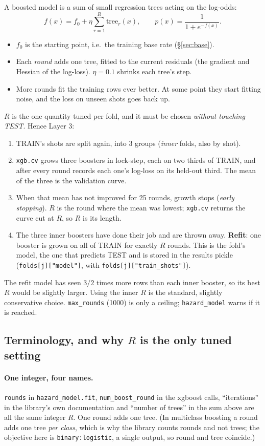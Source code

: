 \documentclass[11pt]{article}
\begin{document}
A boosted model is a sum of small regression trees acting on the log-odds:
\[
f(x) = f_0 + \eta\sum_{r=1}^{R} \mathrm{tree}_r(x),
\qquad p(x) = \frac{1}{1+e^{-f(x)}} .
\]
\begin{itemize}
\item $f_0$ is the starting point, i.e.\ the training base rate
  (\S\ref{sec:base}).
\item Each \emph{round} adds one tree, fitted to the current residuals (the
  gradient and Hessian of the log-loss). $\eta=0.1$ shrinks each tree's step.
\item More rounds fit the training rows ever better. At some point they start
  fitting noise, and the loss on unseen shots goes back up.
\end{itemize}
$R$ is the one quantity tuned per fold, and it must be chosen \emph{without
touching TEST}. Hence Layer 3:
\begin{enumerate}
\item TRAIN's shots are split again, into 3 groups (\emph{inner} folds, also by
  shot).
\item \texttt{xgb.cv} grows three boosters in lock-step, each on two thirds of
  TRAIN, and after every round records each one's log-loss on its held-out
  third. The mean of the three is the validation curve.
\item When that mean has not improved for 25 rounds, growth stops (\emph{early
  stopping}). $R$ is the round where the mean was lowest; \texttt{xgb.cv}
  returns the curve cut at $R$, so $R$ is its length.
\item The three inner boosters have done their job and are thrown away.
  \textbf{Refit}: one booster is grown on all of TRAIN for exactly $R$ rounds.
  This is the fold's model, the one that predicts TEST and is stored in the
  results pickle (\texttt{folds[j]["model"]}, with
  \texttt{folds[j]["train\_shots"]}).
\end{enumerate}
The refit model has seen $3/2$ times more rows than each inner booster, so its
best $R$ would be slightly larger. Using the inner $R$ is the standard,
slightly conservative choice. \texttt{max\_rounds} (1000) is only a ceiling;
\texttt{hazard\_model} warns if it is reached.

\subsection{Terminology, and why $R$ is the only tuned setting}\label{sec:whyR}

\paragraph{One integer, four names.}
\texttt{rounds} in \texttt{hazard\_model.fit}, \texttt{num\_boost\_round} in
the xgboost calls, ``iterations'' in the library's own documentation and
``number of trees'' in the sum above are all the same integer $R$. One round
adds one tree. (In multiclass boosting a round adds one tree \emph{per class},
which is why the library counts rounds and not trees; the objective here is
\texttt{binary:logistic}, a single output, so round and tree coincide.)
\end{document}
